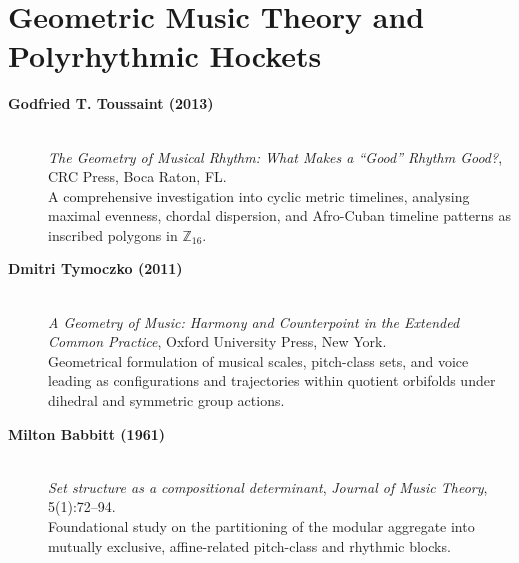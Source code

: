 \section*{Geometric Music Theory and Polyrhythmic Hockets}

\begin{description}
    \item[\textbf{Godfried T. Toussaint (2013)}]\mbox{}\\
    \emph{The Geometry of Musical Rhythm: What Makes a ``Good'' Rhythm Good?}, CRC Press, Boca Raton, FL.\\
    A comprehensive investigation into cyclic metric timelines, analysing maximal evenness, chordal dispersion, and Afro-Cuban timeline patterns as inscribed polygons in $\mathbb{Z}_{16}$.

    \item[\textbf{Dmitri Tymoczko (2011)}]\mbox{}\\
    \emph{A Geometry of Music: Harmony and Counterpoint in the Extended Common Practice}, Oxford University Press, New York.\\
    Geometrical formulation of musical scales, pitch-class sets, and voice leading as configurations and trajectories within quotient orbifolds under dihedral and symmetric group actions.

    \item[\textbf{Milton Babbitt (1961)}]\mbox{}\\
    \emph{Set structure as a compositional determinant}, \emph{Journal of Music Theory}, 5(1):72--94.\\
    Foundational study on the partitioning of the modular aggregate into mutually exclusive, affine-related pitch-class and rhythmic blocks.
\end{description}

